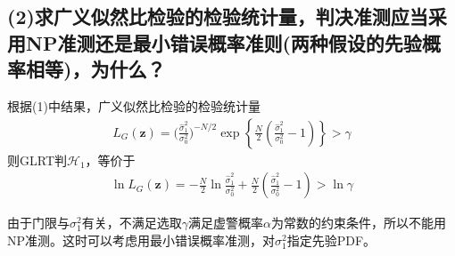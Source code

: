 \documentclass[fontset=windows]{article}
\numberwithin{figure}{section}
\begin{document}
\subsection*{(2)求广义似然比检验的检验统计量，判决准测应当采用NP准测还是最小错误概率准则(两种假设的先验概率相等)，为什么？}
根据(1)中结果，广义似然比检验的检验统计量
\begin{align*}
    L_G(\mathbf{z})=\bigg(\frac{\hat{\sigma}_1^2}{\sigma_0^2}\bigg)^{-N/2}\exp\left\{\frac{N}{2}(\frac{\hat{\sigma}_1^2}{\sigma_0^2}-1) \right\}>\gamma
\end{align*}
则GLRT判\(\mathcal{H}_1\)，等价于
\begin{align*}
    \ln L_G(\mathbf{z})=-\frac{N}{2}\ln\frac{\hat{\sigma}_1^2}{\sigma_0^2}+\frac{N}{2}(\frac{\hat{\sigma}_1^2}{\sigma_0^2}-1)>\ln \gamma
\end{align*}

由于门限与\(\sigma^2_1\)有关，不满足选取\(\gamma\)满足虚警概率\(\alpha\)为常数的约束条件，所以不能用NP准测。这时可以考虑用最小错误概率准测，对\(\sigma^2_1\)指定先验PDF。
\end{document}
